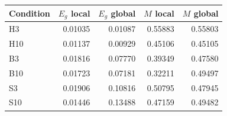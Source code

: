 \begin{tabular}{lrrrr}
\toprule
Condition & $E_g$ local & $E_g$ global & $M$ local & $M$ global\\
\midrule
H3 & 0.01035 & 0.01087 & 0.55883 & 0.55803\\
H10 & 0.01137 & 0.00929 & 0.45106 & 0.45105\\
B3 & 0.01816 & 0.07770 & 0.39349 & 0.47580\\
B10 & 0.01723 & 0.07181 & 0.32211 & 0.49497\\
S3 & 0.01906 & 0.10816 & 0.50795 & 0.47945\\
S10 & 0.01446 & 0.13488 & 0.47159 & 0.49482\\
\bottomrule
\end{tabular}
